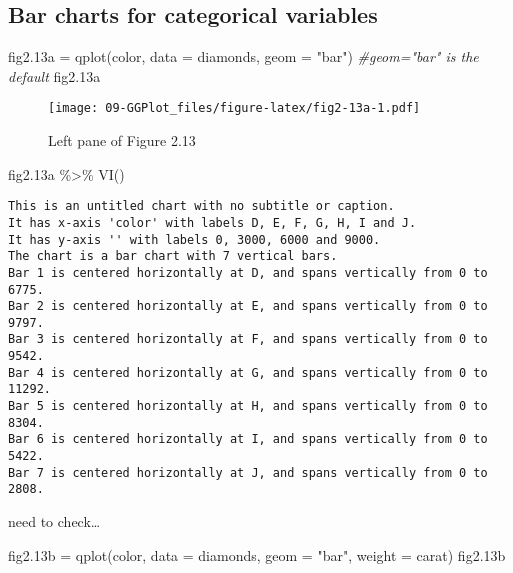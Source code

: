 \documentclass[
]{book}
\newenvironment{Shaded}{\begin{snugshade}}{\end{snugshade}}
\newcommand{\AttributeTok}[1]{\textcolor[rgb]{0.77,0.63,0.00}{#1}}
\newcommand{\CommentTok}[1]{\textcolor[rgb]{0.56,0.35,0.01}{\textit{#1}}}
\newcommand{\FloatTok}[1]{\textcolor[rgb]{0.00,0.00,0.81}{#1}}
\newcommand{\FunctionTok}[1]{\textcolor[rgb]{0.00,0.00,0.00}{#1}}
\newcommand{\NormalTok}[1]{#1}
\newcommand{\OtherTok}[1]{\textcolor[rgb]{0.56,0.35,0.01}{#1}}
\newcommand{\SpecialCharTok}[1]{\textcolor[rgb]{0.00,0.00,0.00}{#1}}
\newcommand{\StringTok}[1]{\textcolor[rgb]{0.31,0.60,0.02}{#1}}
\begin{document}
\hypertarget{bar-charts-for-categorical-variables}{%
\subsection{Bar charts for categorical variables}\label{bar-charts-for-categorical-variables}}

\begin{Shaded}
\begin{Highlighting}[]
\NormalTok{fig2}\FloatTok{.13}\NormalTok{a  }\OtherTok{=} \FunctionTok{qplot}\NormalTok{(color, }\AttributeTok{data =}\NormalTok{ diamonds, }\AttributeTok{geom =} \StringTok{"bar"}\NormalTok{) }\CommentTok{\#geom="bar" is the default    }
\NormalTok{fig2}\FloatTok{.13}\NormalTok{a}
\end{Highlighting}
\end{Shaded}

\begin{figure}
\centering
\texttt{[image: 09-GGPlot\_files/figure-latex/fig2-13a-1.pdf]}
\caption{\label{fig:fig2-13a}Left pane of Figure 2.13}
\end{figure}

\begin{Shaded}
\begin{Highlighting}[]
\NormalTok{fig2}\FloatTok{.13}\NormalTok{a }\SpecialCharTok{\%\textgreater{}\%} \FunctionTok{VI}\NormalTok{()   }
\end{Highlighting}
\end{Shaded}

\begin{verbatim}
This is an untitled chart with no subtitle or caption.
It has x-axis 'color' with labels D, E, F, G, H, I and J.
It has y-axis '' with labels 0, 3000, 6000 and 9000.
The chart is a bar chart with 7 vertical bars.
Bar 1 is centered horizontally at D, and spans vertically from 0 to 6775.
Bar 2 is centered horizontally at E, and spans vertically from 0 to 9797.
Bar 3 is centered horizontally at F, and spans vertically from 0 to 9542.
Bar 4 is centered horizontally at G, and spans vertically from 0 to 11292.
Bar 5 is centered horizontally at H, and spans vertically from 0 to 8304.
Bar 6 is centered horizontally at I, and spans vertically from 0 to 5422.
Bar 7 is centered horizontally at J, and spans vertically from 0 to 2808.
\end{verbatim}

need to check\ldots{}

\begin{Shaded}
\begin{Highlighting}[]
\NormalTok{fig2}\FloatTok{.13}\NormalTok{b }\OtherTok{=} \FunctionTok{qplot}\NormalTok{(color, }\AttributeTok{data =}\NormalTok{ diamonds, }\AttributeTok{geom =} \StringTok{"bar"}\NormalTok{, }\AttributeTok{weight =}\NormalTok{ carat)   }
\NormalTok{fig2}\FloatTok{.13}\NormalTok{b}
\end{Highlighting}
\end{Shaded}
\end{document}
